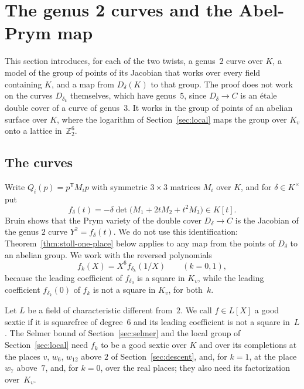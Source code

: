 \documentclass[11pt]{amsart}
\theoremstyle{definition}
\numberwithin{equation}{section}
\newcommand{\Zt}{\mathbb{Z}_2}
\newcommand{\kv}{K_v}
\begin{document}
\section{The genus 2 curves and the Abel-Prym map}
\label{sec:prym}

This section introduces, for each of the two twists, a genus~$2$ curve over $K$, a model of the group of points of its Jacobian that works over every field containing $K$, and a map from $D_\delta(K)$ to that group. The proof does not work on the curves $D_{\delta_k}$ themselves, which have genus~$5$, since $D_\delta\to C$ is an \'etale double cover of a curve of genus~$3$. It works in the group of points of an abelian surface over $K$, where the logarithm of Section~\ref{sec:local} maps the group over $\kv$ onto a lattice in~$\Zt^6$.

\subsection{The curves}
Write $Q_i(p)=p^{\mathsf T}M_ip$ with symmetric $3\times3$ matrices $M_i$ over $K$, and for $\delta\in K^\times$ put
\[
f_\delta(t)=-\delta\det\bigl(M_1+2tM_2+t^2M_3\bigr)\in K[t].
\]
Bruin \cite[Section~8 and Theorem~5.1]{Bruin08} shows that the Prym variety of the double cover $D_\delta\to C$ is the Jacobian of the genus $2$ curve $Y^2=f_\delta(t)$. We do not use this identification: Theorem~\ref{thm:stoll-one-place} below applies to any map from the points of $D_\delta$ to an abelian group. We work with the reversed polynomials
\[
f_k(X)=X^6f_{\delta_k}(1/X)\qquad(k=0,1),
\]
because the leading coefficient of $f_{\delta_0}$ is a square in $\kv$, while the leading coefficient $f_{\delta_k}(0)$ of $f_k$ is not a square in $\kv$, for both~$k$.

Let $L$ be a field of characteristic different from~$2$. We call $f\in L[X]$ a good sextic if it is squarefree of degree~$6$ and its leading coefficient is not a square in~$L$. The Selmer bound of Section~\ref{sec:selmer} and the local group of Section~\ref{sec:local} need $f_k$ to be a good sextic over $K$ and over its completions at the places $v$, $w_6$, $w_{12}$ above $2$ of Section~\ref{sec:descent}, and, for $k=1$, at the place $w_7$ above~$7$, and, for $k=0$, over the real places; they also need its factorization over~$\kv$.
\end{document}
